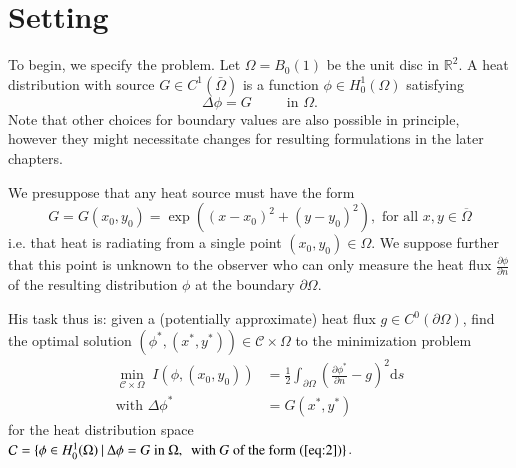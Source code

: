 \section{Setting}
To begin, we specify the problem. Let $\Omega = B_0(1)$ be the unit disc in $\mathbb R^2$. A heat distribution with source $G\in C^1(\bar \Omega)$ is a function $\phi\in H^1_0(\Omega)$ satisfying
\begin{equation}\label{eq:1}
	\Delta \phi = G 
	\hspace{30pt}\text{in }\Omega.
\end{equation}
Note that other choices for boundary values are also possible in principle, however they might necessitate changes for resulting formulations in the later chapters.

We presuppose that any heat source must have the form
\begin{equation}\label{eq:2}
	G=G(x_0,y_0) = \exp\left((x-x_0)^2+(y-y_0)^2\right),\text{ for all }x,y\in\overline{\Omega}
\end{equation}
i.e. that heat is radiating from a single point $(x_0,y_0)\in\Omega$. We suppose further that this point is unknown to the observer who can only measure the heat flux $\frac{\partial \phi}{\partial n}$ of the resulting distribution $\phi$ at the boundary $\partial\Omega$.

His task thus is: given a (potentially approximate) heat flux $g\in C^0(\partial\Omega)$, find the optimal solution $\left(\phi^*,(x^*,y^*)\right)\in \mathcal C\times\Omega$ to the minimization problem
\begin{align}\label{eq:3}
	 \underset{\mathcal C\times\Omega}{\min}\;I(\phi,(x_0,y_0))
	&=\frac{1}{2} 
		\int_{\partial\Omega}
			\left( \frac{\partial \phi^*}{\partial n} - g\right)^2 \mathrm{d}s\\
	\text{with }\Delta \phi^* 
	&= G(x^*,y^*)\label{eq:4}
\end{align}
for the heat distribution space $\mathcal C = \{ \phi\in H^1_0(\Omega)\:|\:\Delta \phi = G\text{ in }\Omega,\:\text{ with $G$ of the form (\ref{eq:2})}\}$.